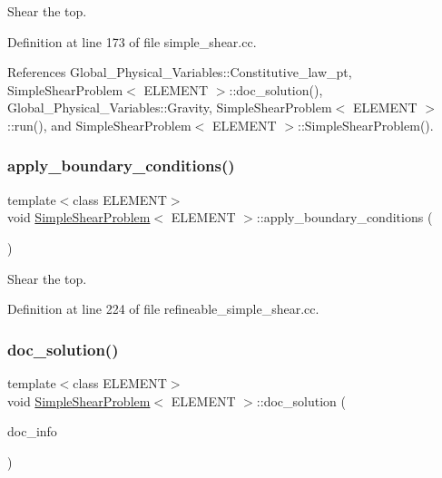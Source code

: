 Shear the top. 



Definition at line 173 of file simple\+\_\+shear.\+cc.



References Global\+\_\+\+Physical\+\_\+\+Variables\+::\+Constitutive\+\_\+law\+\_\+pt, Simple\+Shear\+Problem$<$ E\+L\+E\+M\+E\+N\+T $>$\+::doc\+\_\+solution(), Global\+\_\+\+Physical\+\_\+\+Variables\+::\+Gravity, Simple\+Shear\+Problem$<$ E\+L\+E\+M\+E\+N\+T $>$\+::run(), and Simple\+Shear\+Problem$<$ E\+L\+E\+M\+E\+N\+T $>$\+::\+Simple\+Shear\+Problem().

\mbox{\label{classSimpleShearProblem_a1069985934b36d269b4bc8cb3ba00902}} 
\subsubsection{\texorpdfstring{apply\+\_\+boundary\+\_\+conditions()}{apply\_boundary\_conditions()}\hspace{0.1cm}{\footnotesize\ttfamily [2/2]}}
{\footnotesize\ttfamily template$<$class E\+L\+E\+M\+E\+NT$>$ \\
void \hyperlink{classSimpleShearProblem}{Simple\+Shear\+Problem}$<$ E\+L\+E\+M\+E\+NT $>$\+::apply\+\_\+boundary\+\_\+conditions (\begin{DoxyParamCaption}{ }\end{DoxyParamCaption})\hspace{0.3cm}{\ttfamily [inline]}}



Shear the top. 



Definition at line 224 of file refineable\+\_\+simple\+\_\+shear.\+cc.

\mbox{\label{classSimpleShearProblem_a24c087d9ea194229930bcf9f889a048e}} 
\subsubsection{\texorpdfstring{doc\+\_\+solution()}{doc\_solution()}\hspace{0.1cm}{\footnotesize\ttfamily [1/2]}}
{\footnotesize\ttfamily template$<$class E\+L\+E\+M\+E\+NT$>$ \\
void \hyperlink{classSimpleShearProblem}{Simple\+Shear\+Problem}$<$ E\+L\+E\+M\+E\+NT $>$\+::doc\+\_\+solution (\begin{DoxyParamCaption}\item[{Doc\+Info \&}]{doc\+\_\+info }\end{DoxyParamCaption})}



